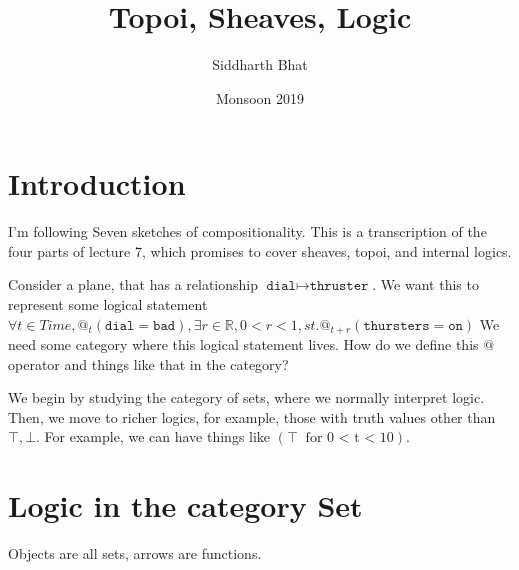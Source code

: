 \documentclass[11pt]{book}
\title{Topoi, Sheaves, Logic}
\author{Siddharth Bhat}
\date{Monsoon 2019}
\newcommand{\R}{\ensuremath{\mathbb R}}
\newcommand{\Set}{\ensuremath{\mathbf{Set}} }
\begin{document}
\maketitle
\tableofcontents

\chapter{Introduction}
I'm following Seven sketches of compositionality. This is a transcription
of the four parts of lecture 7, which promises to cover sheaves, topoi, and
internal logics.

Consider a plane, that has a relationship $\texttt{dial} \mapsto \texttt{thruster}$.
We want this to represent some logical statement 
$\forall t \in Time, @_t (\texttt{dial} = \texttt{bad}), \exists r \in \R, 0 < r < 1, st. @_{t + r} (\texttt{thursters} = \texttt{on})$
We need some category where this logical statement lives. How do we define this
$@$ operator and things like that in the category?

We begin by studying the category of sets, where we normally interpret logic.
Then, we move to richer logics, for example, those with truth values other than
$\top, \bot$. For example, we can have things like $(\top~\text{ for 0 < t < 10})$.

\chapter{Logic in the category \Set}

Objects are all sets, arrows are functions.
\end{document}
